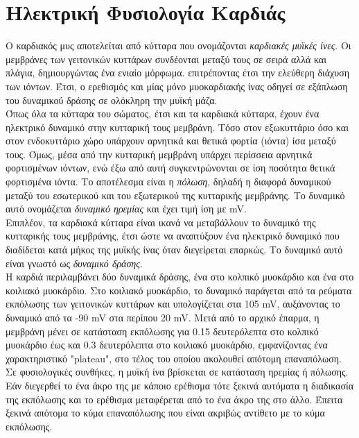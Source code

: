 \section{Ηλεκτρική Φυσιολογία Καρδιάς}
\justifying
Ο καρδιακός μυς αποτελείται από κύτταρα που ονομάζονται \emph{καρδιακές μυϊκές ίνες}. Οι μεμβράνες των γειτονικών κυττάρων συνδέονται μεταξύ τους σε σειρά αλλά και πλάγια, δημιουργώντας ένα ενιαίο μόρφωμα. επιτρέποντας έτσι την ελεύθερη διάχυση των ιόντων. Έτσι, ο ερεθισμός και μίας μόνο μυοκαρδιακής ίνας οδηγεί σε εξάπλωση του δυναμικού δράσης σε ολόκληρη την μυϊκή μάζα.
\\[0.5 \baselineskip]
Όπως όλα τα κύτταρα του σώματος, έτσι και τα καρδιακά κύτταρα, έχουν ένα ηλεκτρικό δυναμικό στην κυτταρική τους μεμβράνη. Τόσο στον εξωκυττάριο όσο και στον ενδοκυττάριο χώρο υπάρχουν αρνητικά και θετικά φορτία (ιόντα) ίσα μεταξύ τους. Όμως, μέσα από την κυτταρική μεμβράνη υπάρχει περίσσεια αρνητικά φορτισμένων ιόντων, ενώ έξω από αυτή συγκεντρώνονται σε ίση ποσότητα θετικά φορτισμένα ιόντα. Το αποτέλεσμα είναι η \emph{πόλωση}, δηλαδή η διαφορά δυναμικού μεταξύ του εσωτερικού και του εξωτερικού της κυτταρικής μεμβράνης. Το δυναμικό αυτό ονομάζεται \emph{δυναμικό ηρεμίας} και έχει τιμή ίση με  mV.\gr
\\[2 \baselineskip]
Επιπλέον, τα καρδιακά κύτταρα είναι ικανά να μεταβάλλουν το δυναμικό της κυτταρικής τους μεμβράνης, έτσι ώστε να αναπτύξουν ένα ηλεκτρικό δυναμικό που διαδίδεται κατά μήκος της μυϊκής ίνας όταν διεγείρεται επαρκώς. Το δυναμικό αυτό είναι γνωστό ως \emph{δυναμικό δράσης}.
\\[0.5 \baselineskip]
Η καρδιά περιλαμβάνει δύο δυναμικά δράσης, ένα στο κολπικό μυοκάρδιο και ένα στο κοιλιακό μυοκάρδιο. Στο κοιλιακό μυοκάρδιο, το δυναμικό παράγεται από τα ρεύματα εκπόλωσης των γειτονικών κυττάρων και υπολογίζεται στα 105 \en mV, \gr αυξάνοντας το δυναμικό από τα -90 \en mV \gr στα περίπου 20 \en mV. \gr Μετά από το αρχικό έπαρμα, η μεμβράνη μένει σε κατάσταση εκπόλωσης για 0.15 δευτερόλεπτα στο κολπικό μυοκάρδιο έως και 0.3 δευτερόλεπτα στο κοιλιακό μυοκάρδιο, εμφανίζοντας ένα χαρακτηριστικό \en "plateau", \gr στο τέλος του οποίου ακολουθεί απότομη επαναπόλωση.
\\[0.5 \baselineskip]
Σε φυσιολογικές συνθήκες, η μυϊκή ίνα βρίσκεται σε κατάσταση ηρεμίας ή πόλωσης. Εάν διεγερθεί το ένα άκρο της με κάποιο ερέθισμα τότε ξεκινά αυτόματα η διαδικασία της εκπόλωσης και το ερέθισμα μεταφέρεται από το ένα άκρο της στο άλλο. Έπειτα ξεκινά απότομα το κύμα επαναπόλωσης που είναι ακριβώς αντίθετο με το κύμα εκπόλωσης.
